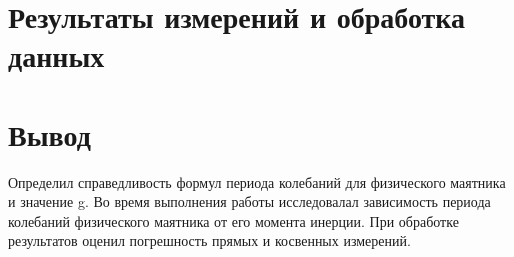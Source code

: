 \documentclass[a4paper,12pt]{article}
\begin{document}
\section{Результаты измерений и обработка данных}


\section{Вывод}
Определил справедливость формул периода колебаний для физического маятника и значение g. Во время выполнения работы исследовалал зависимость периода колебаний физического маятника от его момента инерции. При обработке результатов оценил погрешность прямых и косвенных измерений.
\end{document}
